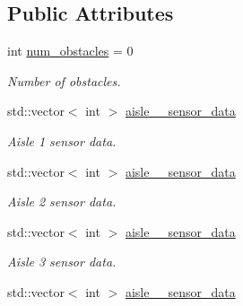 \subsection*{Public Attributes}
\begin{DoxyCompactItemize}
\item 
\mbox{\label{classObstaclesInAisle_a249e7e48865ed9e778beb4e153128d16}} 
int \hyperlink{classObstaclesInAisle_a249e7e48865ed9e778beb4e153128d16}{num\+\_\+obstacles} = 0
\begin{DoxyCompactList}\small\item\em Number of obstacles. \end{DoxyCompactList}\item 
\mbox{\label{classObstaclesInAisle_a6e77c0470caedc4ec4a1a6dce61b25ba}} 
std\+::vector$<$ int $>$ \hyperlink{classObstaclesInAisle_a6e77c0470caedc4ec4a1a6dce61b25ba}{aisle\+\_\+\_\+sensor\+\_\+data}
\begin{DoxyCompactList}\small\item\em Aisle 1 sensor data. \end{DoxyCompactList}\item 
\mbox{\label{classObstaclesInAisle_a7a2b0d66baf6b26a133028eae236ac09}} 
std\+::vector$<$ int $>$ \hyperlink{classObstaclesInAisle_a7a2b0d66baf6b26a133028eae236ac09}{aisle\+\_\+\_\+sensor\+\_\+data}
\begin{DoxyCompactList}\small\item\em Aisle 2 sensor data. \end{DoxyCompactList}\item 
\mbox{\label{classObstaclesInAisle_adc6a05051fdaa774a8d856f8be08ee83}} 
std\+::vector$<$ int $>$ \hyperlink{classObstaclesInAisle_adc6a05051fdaa774a8d856f8be08ee83}{aisle\+\_\+\_\+sensor\+\_\+data}
\begin{DoxyCompactList}\small\item\em Aisle 3 sensor data. \end{DoxyCompactList}\item 
\mbox{\label{classObstaclesInAisle_aa7e031213bce831621cd41c3a99eb3a0}} 
std\+::vector$<$ int $>$ \hyperlink{classObstaclesInAisle_aa7e031213bce831621cd41c3a99eb3a0}{aisle\+\_\+\_\+sensor\+\_\+data}

\end{DoxyCompactItemize}
